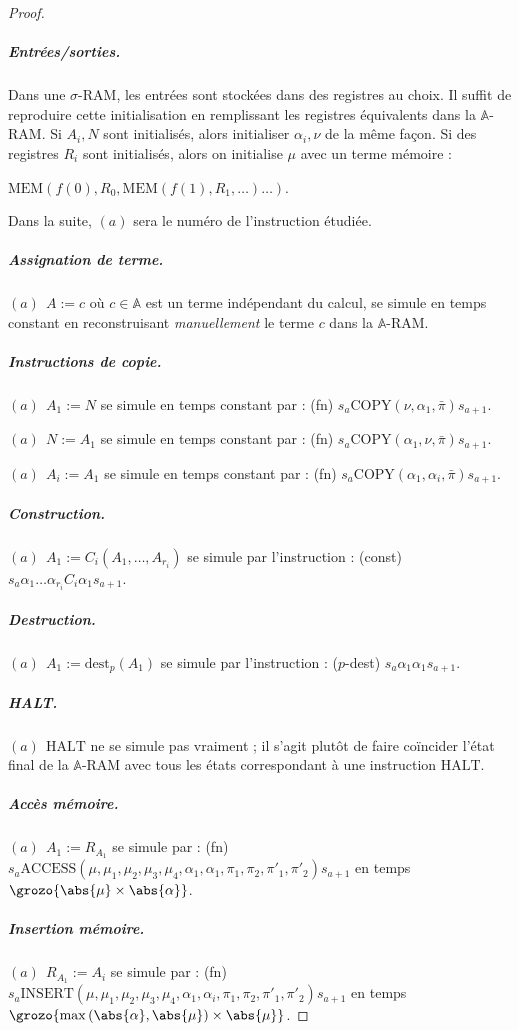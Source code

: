 \documentclass{report}
\newcommand{\bbA}{\mathbb{A}}
\begin{document}
\begin{proof}
						\subparagraph{Entrées/sorties.}
						Dans une $\sigma$-RAM, les entrées sont stockées dans des registres au choix. Il suffit de reproduire cette initialisation en remplissant les registres équivalents dans la $\bbA$-RAM. Si $A_i, N$ sont initialisés, alors initialiser $\alpha_i, \nu$ de la même façon. Si des registres $R_i$ sont initialisés, alors on initialise $\mu$ avec un terme mémoire : 
						
						$\text{MEM}\left( f(0), R_0, \text{MEM}\left( f(1), R_1, \dots \right) \dots \right)$.
						
						Dans la suite, $(a)$ sera le numéro de l'instruction étudiée. 
						
						\subparagraph{Assignation de terme.}
						$(a) \:\: A := c$ où $c \in \bbA$ est un terme indépendant du calcul, se simule en temps constant en reconstruisant \emph{manuellement} le terme $c$ dans la $\bbA$-RAM. 
						
						\subparagraph{Instructions de copie.}
						$(a) \:\: A_1 := N$ se simule en temps constant par : (fn) $s_a \text{COPY}(\nu, \alpha_1, \bar{\pi}) s_{a+1}$.
						 
						$(a) \:\: N := A_1$ se simule en temps constant par : (fn) $s_a \text{COPY}(\alpha_1, \nu, \bar{\pi}) s_{a+1}$.
						
						$(a) \:\: A_i := A_1$ se simule en temps constant par : (fn) $s_a \text{COPY}(\alpha_1, \alpha_i, \bar{\pi}) s_{a+1}$.
					
						\subparagraph{Construction.}
						$(a) \:\: A_1 := C_i(A_1, \dots, A_{r_i})$ se simule par l'instruction : (const) $s_a \alpha_1 \dots \alpha_{r_i} C_i \alpha_1 s_{a+1}$.
						
						\subparagraph{Destruction.}
						$(a) \:\: A_1 := \text{dest}_p(A_1)$ se simule par l'instruction : ($p$-dest) $s_a \alpha_1 \alpha_1 s_{a+1}$.
						
						\subparagraph{HALT.}
						$(a) \:\: \text{HALT}$ ne se simule pas vraiment ; il s'agit plutôt de faire coïncider l'état final de la $\bbA$-RAM avec tous les états correspondant à une instruction $\text{HALT}$. 
						
						\subparagraph{Accès mémoire.}
						$(a) \:\: A_1 := R_{A_1}$ se simule par : (fn) $s_a \text{ACCESS}\left( \mu, \mu_1, \mu_2, \mu_3, \mu_4, \alpha_1, \alpha_1, \pi_1, \pi_2, \pi'_1, \pi'_2\right) s_{a+1}$ en temps $\grozo{\abs{\mu} \times \abs{\alpha}}$.
						
						\subparagraph{Insertion mémoire.}
						$(a) \:\: R_{A_1} := A_i$ se simule par : (fn) $s_a \text{INSERT}\left( \mu, \mu_1, \mu_2, \mu_3, \mu_4, \alpha_1, \alpha_i, \pi_1, \pi_2, \pi'_1, \pi'_2\right) s_{a+1}$ en temps $\grozo{\max\left( \abs{\alpha}, \abs{\mu} \right)\times \abs{\mu}}$. 
						

\end{proof}
\end{document}
